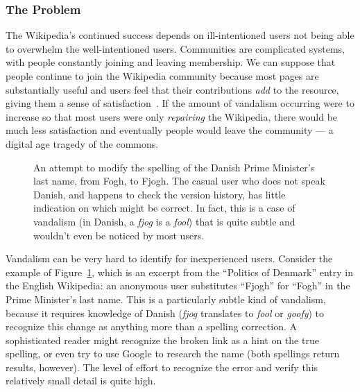 \subsubsection*{The Problem}

The Wikipedia's continued success depends on ill-intentioned users
not being able to overwhelm the well-intentioned users.
Communities are complicated systems, with people constantly joining and
leaving membership.
We can suppose that people continue to
join the Wikipedia community because most pages are
substantially useful and users feel that their contributions
\textit{add} to the resource,
giving them a sense of satisfaction~\cite{Benkler2002}.
If the amount of vandalism occurring were to increase so that
most users were only \textit{repairing} the Wikipedia, there
would be much less satisfaction and eventually people would
leave the community --- a digital age tragedy of the commons.

\begin{figure}[t]
\centering
{}
\hspace{1ex}
\caption{An attempt to modify the
  spelling of the Danish Prime Minister's last name, from Fogh, to Fjogh.
  The casual user who does not speak Danish, and happens to check
  the version history, has little indication on which might be correct.
  In fact, this is a case of vandalism
  (in Danish, a \textit{fjog} is a \textit{fool})
  that is quite subtle and wouldn't even be noticed by most users.}
\label{fig-denmark}
\end{figure}


Vandalism can be very hard to identify for inexperienced users.
Consider the example of Figure~\ref{fig-denmark},
which is an excerpt from the ``Politics of Denmark''
entry in the English Wikipedia: an anonymous user substitutes
``Fjogh'' for ``Fogh'' in the Prime Minister's last name.
This is a particularly subtle kind of vandalism,
because it requires knowledge of Danish
(\textit{fjog} translates to \textit{fool} or \textit{goofy})
to recognize this change as anything more than a spelling correction.
A sophisticated reader might recognize the broken link
as a hint on the true spelling, or even try to use Google
to research the name (both spellings return results, however).
The level of effort to recognize the error and
verify this relatively small detail is quite high.

